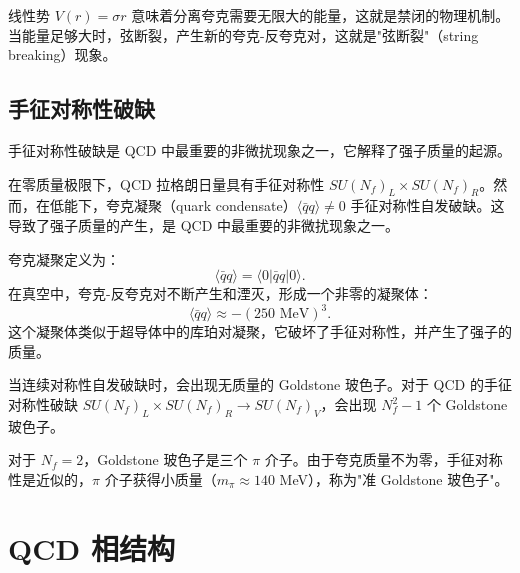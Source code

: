 \begin{remark}
线性势 $V(r) = \sigma r$ 意味着分离夸克需要无限大的能量，这就是禁闭的物理机制。当能量足够大时，弦断裂，产生新的夸克-反夸克对，这就是"弦断裂"（string breaking）现象。
\end{remark}

\subsection{手征对称性破缺}

手征对称性破缺是 QCD 中最重要的非微扰现象之一，它解释了强子质量的起源。

\begin{property}[手征对称性破缺]
在零质量极限下，QCD 拉格朗日量具有手征对称性 $SU(N_f)_L \times SU(N_f)_R$。然而，在低能下，夸克凝聚（quark condensate）$\langle \bar{q}q \rangle \neq 0$ 手征对称性自发破缺。这导致了强子质量的产生，是 QCD 中最重要的非微扰现象之一。
\end{property}

\begin{definition}[夸克凝聚]
夸克凝聚定义为：
\begin{equation}
    \langle \bar{q}q \rangle = \langle 0 | \bar{q}q | 0 \rangle.
\end{equation}
在真空中，夸克-反夸克对不断产生和湮灭，形成一个非零的凝聚体：
\begin{equation}
    \langle \bar{q}q \rangle \approx -(250 \text{ MeV})^3.
\end{equation}
这个凝聚体类似于超导体中的库珀对凝聚，它破坏了手征对称性，并产生了强子的质量。
\end{definition}

\begin{theorem}[Goldstone 定理]
当连续对称性自发破缺时，会出现无质量的 Goldstone 玻色子。对于 QCD 的手征对称性破缺 $SU(N_f)_L \times SU(N_f)_R \to SU(N_f)_V$，会出现 $N_f^2 - 1$ 个 Goldstone 玻色子。
\end{theorem}

\begin{remark}
对于 $N_f = 2$，Goldstone 玻色子是三个 $\pi$ 介子。由于夸克质量不为零，手征对称性是近似的，$\pi$ 介子获得小质量（$m_\pi \approx 140$ MeV），称为"准 Goldstone 玻色子"。
\end{remark}

\section{QCD 相结构}

